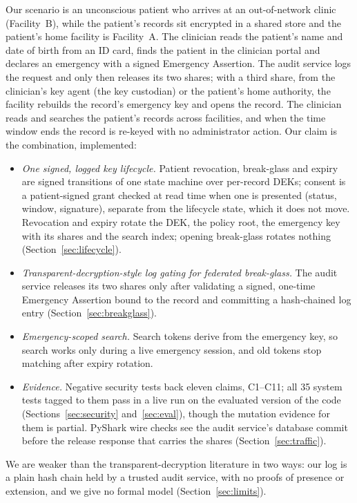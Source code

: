 Our scenario is an unconscious patient who arrives at an out-of-network clinic (Facility~B), while the patient's records sit encrypted in a shared store and the patient's home facility is Facility~A.
The clinician reads the patient's name and date of birth from an ID card, finds the patient in the clinician portal and declares an emergency with a signed Emergency Assertion.
The audit service logs the request and only then releases its two shares; with a third share, from the clinician's key agent (the key custodian) or the patient's home authority, the facility rebuilds the record's emergency key and opens the record.
The clinician reads and searches the patient's records across facilities, and when the time window ends the record is re-keyed with no administrator action.
Our claim is the combination, implemented:
\begin{itemize}
\item \emph{One signed, logged key lifecycle.}
Patient revocation, break-glass and expiry are signed transitions of one state machine over per-record DEKs; consent is a patient-signed grant checked at read time when one is presented (status, window, signature), separate from the lifecycle state, which it does not move.
Revocation and expiry rotate the DEK, the policy root, the emergency key with its shares and the search index; opening break-glass rotates nothing (Section~\ref{sec:lifecycle}).
\item \emph{Transparent-decryption-style log gating for federated break-glass.}
The audit service releases its two shares only after validating a signed, one-time Emergency Assertion bound to the record and committing a hash-chained log entry (Section~\ref{sec:breakglass}).
\item \emph{Emergency-scoped search.}
Search tokens derive from the emergency key, so search works only during a live emergency session, and old tokens stop matching after expiry rotation.
\item \emph{Evidence.}
Negative security tests back eleven claims, C1--C11; all 35 system tests tagged to them pass in a live run on the evaluated version of the code (Sections~\ref{sec:security} and~\ref{sec:eval}), though the mutation evidence for them is partial.
PyShark wire checks see the audit service's database commit before the release response that carries the shares (Section~\ref{sec:traffic}).
\end{itemize}
We are weaker than the transparent-decryption literature in two ways: our log is a plain hash chain held by a trusted audit service, with no proofs of presence or extension, and we give no formal model (Section~\ref{sec:limits}).
